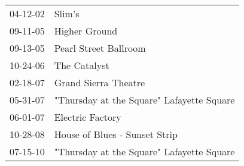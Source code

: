 \begin{supertabular}{p{0.25\columnwidth}p{0.75\columnwidth}}
 04-12-02 &                                     Slim's \\
 09-11-05 &                              Higher Ground \\
 09-13-05 &                      Pearl Street Ballroom \\
 10-24-06 &                               The Catalyst \\
 02-18-07 &                       Grand Sierra Theatre \\
 05-31-07 &  "Thursday at the Square" Lafayette Square \\
 06-01-07 &                           Electric Factory \\
 10-28-08 &              House of Blues - Sunset Strip \\
 07-15-10 &  "Thursday at the Square" Lafayette Square \\
\end{supertabular}
